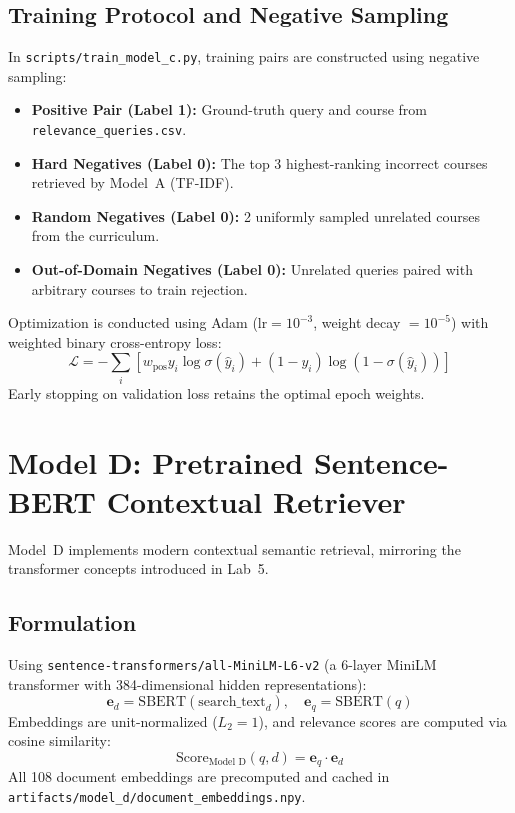 \documentclass[12pt,a4paper]{report}
\begin{document}
\subsection{Training Protocol and Negative Sampling}
In \texttt{scripts/train\_model\_c.py}, training pairs are constructed using negative sampling:
\begin{itemize}
    \item \textbf{Positive Pair (Label 1):} Ground-truth query and course from \texttt{relevance\_queries.csv}.
    \item \textbf{Hard Negatives (Label 0):} The top 3 highest-ranking incorrect courses retrieved by Model~A (TF-IDF).
    \item \textbf{Random Negatives (Label 0):} 2 uniformly sampled unrelated courses from the curriculum.
    \item \textbf{Out-of-Domain Negatives (Label 0):} Unrelated queries paired with arbitrary courses to train rejection.
\end{itemize}
Optimization is conducted using Adam ($\text{lr} = 10^{-3}$, weight decay $= 10^{-5}$) with weighted binary cross-entropy loss:
\begin{equation}
    \mathcal{L} = -\sum_{i} \left[ w_{\text{pos}} y_i \log \sigma(\hat{y}_i) + (1 - y_i) \log (1 - \sigma(\hat{y}_i)) \right]
\end{equation}
Early stopping on validation loss retains the optimal epoch weights.

\section{Model D: Pretrained Sentence-BERT Contextual Retriever}
Model~D implements modern contextual semantic retrieval, mirroring the transformer concepts introduced in Lab~5.

\subsection{Formulation}
Using \texttt{sentence-transformers/all-MiniLM-L6-v2} (a 6-layer MiniLM transformer with 384-dimensional hidden representations):
\begin{equation}
    \mathbf{e}_d = \text{SBERT}(\text{search\_text}_d), \quad \mathbf{e}_q = \text{SBERT}(q)
\end{equation}
Embeddings are unit-normalized ($L_2=1$), and relevance scores are computed via cosine similarity:
\begin{equation}
    \text{Score}_{\text{Model D}}(q, d) = \mathbf{e}_q \cdot \mathbf{e}_d
\end{equation}
All 108 document embeddings are precomputed and cached in \texttt{artifacts/model\_d/document\_embeddings.npy}.
\end{document}
